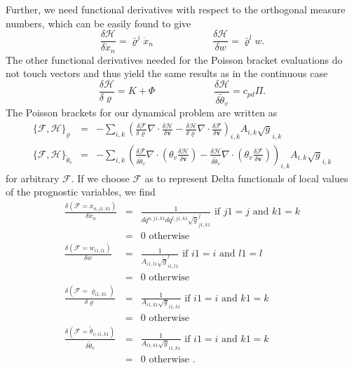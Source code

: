 Further, we need functional derivatives with respect to the orthogonal measure numbers, which can be easily found to give
\begin{displaymath}
 \frac{\delta\mathcal{H}}{\delta \dot{x}_n}=\bar{\varrho}^j \dot{x}_n\qquad\qquad\qquad
 \frac{\delta\mathcal{H}}{\delta w}=\bar{\varrho}^l w.
\end{displaymath}
The other functional derivatives needed for the Poisson bracket evaluations do not touch vectors and thus
yield the same results as in the continuous case
\begin{displaymath}
 \frac{\delta\mathcal{H}}{\delta\varrho}=K+\Phi\qquad\qquad\qquad
 \frac{\delta\mathcal{H}}{\delta\tilde\theta_v}=c_{pd}\Pi.
\end{displaymath}
The Poisson brackets for our dynamical problem are written as
\begin{eqnarray}
 \{\mathcal{F},\mathcal{H}\}_{\varrho}&=&-\sum_{i,k}\left(
     \frac{\delta\mathcal{F}}{\delta \varrho}\nabla\cdot\frac{\delta\mathcal{H}}{\delta\mathbf{v}}-
     \frac{\delta\mathcal{H}}{\delta \varrho}\nabla\cdot\frac{\delta\mathcal{F}}{\delta\mathbf{v}}
     \right)_{i,k} A_{i,k}\sqrt{g}_{i,k}
\label{eqn_poiss1}\\
\{\mathcal{F},\mathcal{H}\}_{\tilde\theta_v}&=&-\sum_{i,k}\left(
\frac{\delta\mathcal{F}}{\delta\tilde\theta_{v}}\nabla\cdot
\left(\theta_v\frac{\delta\mathcal{H}}{\delta\mathbf{v}}\right)-
\frac{\delta\mathcal{H}}{\delta\tilde\theta_{v}}\nabla\cdot
\left(\theta_v\frac{\delta\mathcal{F}}{\delta\mathbf{v}}\right)
     \right)_{i,k} A_{i,k}\sqrt{g}_{i,k}
\label{eqn_poiss2}
\end{eqnarray}
for arbitrary $\mathcal{F}$. If we choose $\mathcal{F}$ as to represent Delta functionals of local
values of the prognostic variables, we find
\begin{eqnarray*}
 \frac{\delta(\mathcal{F}=\dot{x}_{n,j1,k1})}{\delta\dot{x}_n}&=&
                          \frac{1}{dq^{n,j1,k1}dq^{t,j1,k1}\overline{\sqrt{g}}^j_{j1,k1}}
                          \mbox{ if } j1=j \mbox{ and } k1=k\\
                          &=&0 \mbox{ otherwise }\\
 \frac{\delta(\mathcal{F}=w_{i1,l1})}{\delta w}&=&
                          \frac{1}{A_{i1,l1}\overline{\sqrt{g}}^l_{i1,l1}}
                          \mbox{ if } i1=i \mbox{ and } l1=l\\
                          &=&0 \mbox{ otherwise }\\
 \frac{\delta(\mathcal{F}=\varrho_{i1,k1})}{\delta\varrho}&=&
                          \frac{1}{A_{i1,k1}\sqrt{g}_{i1,k1}}
                          \mbox{ if } i1=i \mbox{ and } k1=k\\
                          &=&0 \mbox{ otherwise }\\
\frac{\delta(\mathcal{F}=\tilde\theta_{v,i1,k1})}{\delta\tilde\theta_v}&=&
                          \frac{1}{A_{i1,k1}\sqrt{g}_{i1,k1}}
                          \mbox{ if } i1=i \mbox{ and } k1=k\\
                          &=&0 \mbox{ otherwise }.
\end{eqnarray*}

